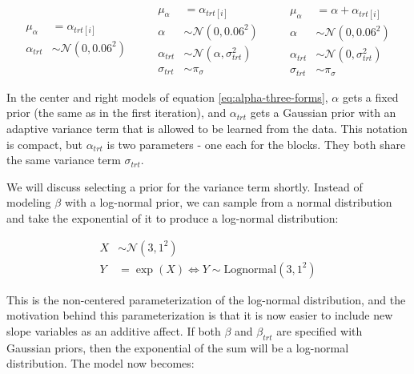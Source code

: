 \documentclass[11pt, oneside, openany]{scrbook}
\begin{document}

\begin{equation}
  \begin{split}
    \mu_\alpha &= \alpha_{trt[i]} \\
    \alpha_{trt} &\sim \mathcal{N}(0, 0.06^2)
  \end{split}
\qquad
  \begin{split}
    \mu_\alpha &= \alpha_{trt[i]} \\
    \alpha &\sim \mathcal{N}(0, 0.06^2) \\
    \alpha_{trt} &\sim \mathcal{N}(\alpha, \sigma_{trt}^2) \\
    \sigma_{trt} &\sim \pi_{\sigma}
  \end{split}
\qquad
  \begin{split}
    \mu_\alpha &= \alpha + \alpha_{trt[i]} \\
    \alpha &\sim \mathcal{N}(0, 0.06^2) \\
    \alpha_{trt} &\sim \mathcal{N}(0, \sigma_{trt}^2) \\
    \sigma_{trt} &\sim \pi_{\sigma}
  \end{split}
\label{eq:alpha-three-forms}
\end{equation}

In the center and right models of equation \eqref{eq:alpha-three-forms}, \(\alpha\) gets a fixed prior (the same as in the first iteration), and \(\alpha_{trt}\) gets a Gaussian prior with an adaptive variance term that is allowed to be learned from the data. This notation is compact, but \(\alpha_{trt}\) is two parameters - one each for the blocks. They both share the same variance term \(\sigma_{trt}\).

We will discuss selecting a prior for the variance term shortly. Instead of modeling \(\beta\) with a log-normal prior, we can sample from a normal distribution and take the exponential of it to produce a log-normal distribution:


\begin{align*}
X &\sim \mathcal{N}(3, 1^2) \\
Y &= \exp\left(X\right) \Longleftrightarrow Y \sim \mathrm{Lognormal(3, 1^2)}
\end{align*}

This is the non-centered parameterization of the log-normal distribution, and the motivation behind this parameterization is that it is now easier to include new slope variables as an additive affect. If both \(\beta\) and \(\beta_{trt}\) are specified with Gaussian priors, then the exponential of the sum will be a log-normal distribution. The model now becomes:
\end{document}
